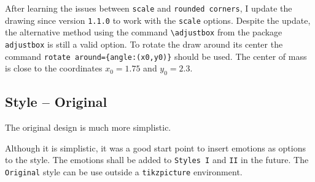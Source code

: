 \documentclass[12pt]{article}
\begin{document}

After learning the issues between \texttt{scale} and \texttt{rounded corners}, I update the drawing since version \texttt{1.1.0} to work with the \texttt{scale} options. Despite the update, the alternative method using the command \texttt{{\textbackslash}adjustbox} from the package \texttt{adjustbox} is still a valid option.
To rotate the draw around its center the command \texttt{rotate around=\{angle:(x0,y0)\}} should be used. The center of mass is close to the coordinates $x_0 = 1.75$ and $y_0 = 2.3$.

\begin{FHZtcbAmongUs}[title=Scaling with scale, sidebyside, righthand ratio=0.40]
\end{FHZtcbAmongUs}

\subsection{Style -- Original}

The original design is much more simplistic.

\begin{FHZtcbAmongUs}[title=Original Design -- Inside \textit{tikzpicture}]
\end{FHZtcbAmongUs}

Although it is simplistic, it was a good start point to insert emotions as options to the style. The emotions shall be added to \texttt{Styles I} and \texttt{II} in the future. The \texttt{Original} style can be use outside a \texttt{tikzpicture} environment.
\end{document}
